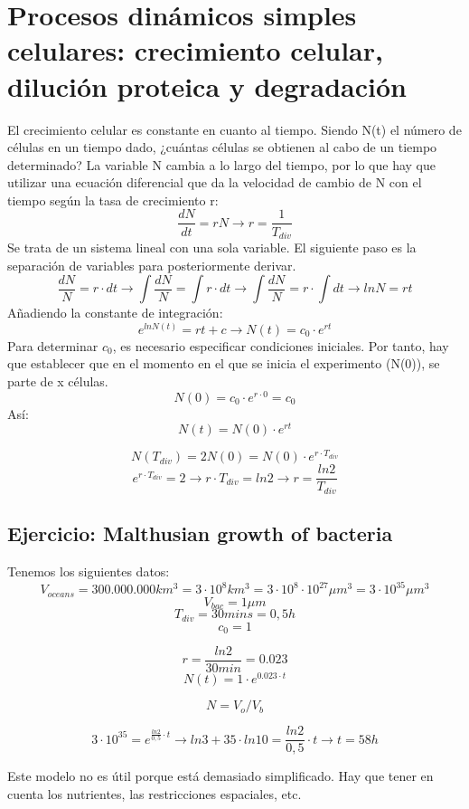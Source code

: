 \section{Procesos dinámicos simples celulares: crecimiento celular, dilución proteica y degradación}
El crecimiento celular es constante en cuanto al tiempo.
Siendo N(t) el número de células en un tiempo dado, ¿cuántas células se obtienen al cabo de un tiempo determinado? La variable N cambia a lo largo del tiempo, por lo que hay que utilizar una ecuación diferencial que da la velocidad de cambio de N con el tiempo según la tasa de crecimiento r: 
$$\frac{dN}{dt} = r N \rightarrow r = \frac{1}{T_{div}}$$
Se trata de un sistema lineal con una sola variable. El siguiente paso es la separación de variables para posteriormente derivar. 
$$\frac{dN}{N} = r \cdot dt \rightarrow \int \frac{dN}{N} = \int r \cdot dt \rightarrow \int \frac{dN}{N} = r \cdot \int dt \rightarrow ln N = r t$$
Añadiendo la constante de integración:
$$e^{ln N(t)} = rt + c \rightarrow N(t) = c_0 \cdot e^{rt}$$
Para determinar $c_0$, es necesario especificar condiciones iniciales. Por tanto, hay que establecer que en el momento en el que se inicia el experimento (N(0)), se parte de x células.
$$N(0) = c_0 \cdot e^{r\cdot 0} = c_0$$
Así:
$$N(t) = N(0) \cdot e^{rt}$$

$$N(T_{div}) = 2N(0) = N(0) \cdot e^{r \cdot T_{div}}$$
$$ e^{r \cdot T_{div}} = 2 \rightarrow r \cdot T_{div} = ln 2 \rightarrow r = \frac{ln 2}{T_{div}}$$

\subsection{Ejercicio: Malthusian growth of bacteria}
Tenemos los siguientes datos:
$$V_{oceans} = 300.000.000 km^3 = 3 \cdot 10^8 km^3 = 3 \cdot 10^8 \cdot 10^{27} \mu m^3 = 3 \cdot 10^{35} \mu m^3$$
$$V_{bac} = 1 \mu m$$
$$T_{div} = 30 mins = 0,5 h$$
$$c_0 = 1$$

$$r = \frac{ln 2}{30 min} = 0.023$$
$$N(t) = 1 \cdot e^{0.023 \cdot t}$$

$$N = V_o / V_b$$

$$3 \cdot 10^{35} = e^{\frac{ln 2}{0,5} \cdot t} \rightarrow ln 3 + 35 \cdot ln 10 = \frac{ln 2}{0,5} \cdot t \rightarrow t = 58 h$$

Este modelo no es útil porque está demasiado simplificado. Hay que tener en cuenta los nutrientes, las restricciones espaciales, etc. 